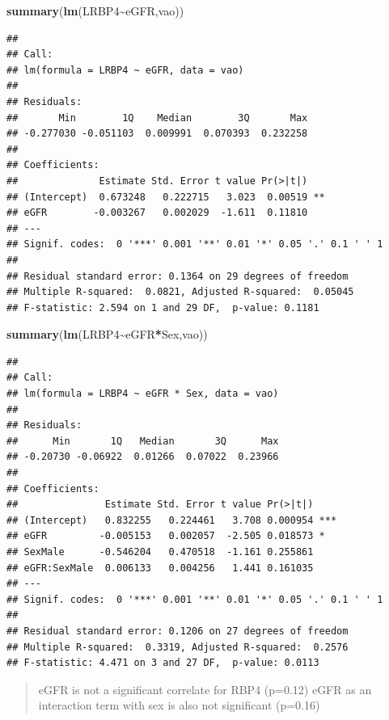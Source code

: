 \documentclass[
]{article}
\newenvironment{Shaded}{\begin{snugshade}}{\end{snugshade}}
\newcommand{\FunctionTok}[1]{\textcolor[rgb]{0.13,0.29,0.53}{\textbf{#1}}}
\newcommand{\NormalTok}[1]{#1}
\newcommand{\SpecialCharTok}[1]{\textcolor[rgb]{0.81,0.36,0.00}{\textbf{#1}}}
\begin{document}
\begin{Shaded}
\begin{Highlighting}[]
\FunctionTok{summary}\NormalTok{(}\FunctionTok{lm}\NormalTok{(LRBP4}\SpecialCharTok{\textasciitilde{}}\NormalTok{eGFR,vao))}
\end{Highlighting}
\end{Shaded}

\begin{verbatim}
## 
## Call:
## lm(formula = LRBP4 ~ eGFR, data = vao)
## 
## Residuals:
##       Min        1Q    Median        3Q       Max 
## -0.277030 -0.051103  0.009991  0.070393  0.232258 
## 
## Coefficients:
##              Estimate Std. Error t value Pr(>|t|)   
## (Intercept)  0.673248   0.222715   3.023  0.00519 **
## eGFR        -0.003267   0.002029  -1.611  0.11810   
## ---
## Signif. codes:  0 '***' 0.001 '**' 0.01 '*' 0.05 '.' 0.1 ' ' 1
## 
## Residual standard error: 0.1364 on 29 degrees of freedom
## Multiple R-squared:  0.0821, Adjusted R-squared:  0.05045 
## F-statistic: 2.594 on 1 and 29 DF,  p-value: 0.1181
\end{verbatim}

\begin{Shaded}
\begin{Highlighting}[]
\FunctionTok{summary}\NormalTok{(}\FunctionTok{lm}\NormalTok{(LRBP4}\SpecialCharTok{\textasciitilde{}}\NormalTok{eGFR}\SpecialCharTok{*}\NormalTok{Sex,vao))}
\end{Highlighting}
\end{Shaded}

\begin{verbatim}
## 
## Call:
## lm(formula = LRBP4 ~ eGFR * Sex, data = vao)
## 
## Residuals:
##      Min       1Q   Median       3Q      Max 
## -0.20730 -0.06922  0.01266  0.07022  0.23966 
## 
## Coefficients:
##               Estimate Std. Error t value Pr(>|t|)    
## (Intercept)   0.832255   0.224461   3.708 0.000954 ***
## eGFR         -0.005153   0.002057  -2.505 0.018573 *  
## SexMale      -0.546204   0.470518  -1.161 0.255861    
## eGFR:SexMale  0.006133   0.004256   1.441 0.161035    
## ---
## Signif. codes:  0 '***' 0.001 '**' 0.01 '*' 0.05 '.' 0.1 ' ' 1
## 
## Residual standard error: 0.1206 on 27 degrees of freedom
## Multiple R-squared:  0.3319, Adjusted R-squared:  0.2576 
## F-statistic: 4.471 on 3 and 27 DF,  p-value: 0.0113
\end{verbatim}

\begin{quote}
eGFR is not a significant correlate for RBP4 (p=0.12) eGFR as an
interaction term with sex is also not significant (p=0.16)
\end{quote}
\end{document}

